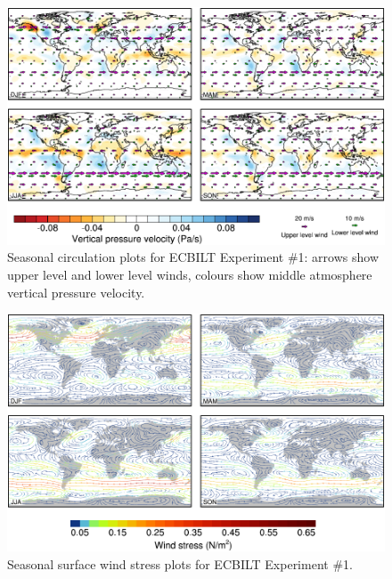 \documentclass[a4paper,11pt]{article}
\begin{document}
\begin{figure}
  \begin{center}
    \includegraphics[width=\textwidth]{../expt-1/plots/wind-plots}
  \end{center}
  \caption{Seasonal circulation plots for ECBILT Experiment \#1:
    arrows show upper level and lower level winds, colours show middle
    atmosphere vertical pressure velocity.}
  \label{fig:wind-1}
\end{figure}


\begin{figure}
  \begin{center}
    \includegraphics[width=\textwidth]{../expt-1/plots/stress-plots}
  \end{center}
  \caption{Seasonal surface wind stress plots for ECBILT Experiment
    \#1.}
  \label{fig:stress-1}
\end{figure}


\end{document}
